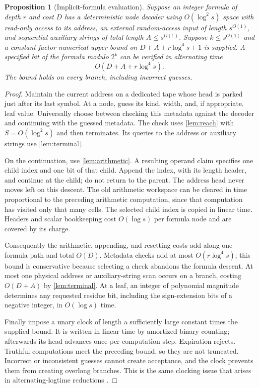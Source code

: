 \documentclass[11pt]{article}
\newtheorem{proposition}[theorem]{Proposition}
\theoremstyle{definition}
\theoremstyle{remark}
\begin{document}
\begin{proposition}[Implicit-formula evaluation]\label{prop:evaluate}
Suppose an integer formula of depth $r$ and cost $D$ has a deterministic node decoder using $O(\log^2s)$ space with read-only access to its address, an external random-access input of length $s^{O(1)}$, and sequential auxiliary strings of total length $A\le s^{O(1)}$. Suppose $k\le s^{O(1)}$ and a constant-factor numerical upper bound on $D+A+r\log^4s+1$ is supplied. A specified bit of the formula modulo $2^k$ can be verified in alternating time
\[
 O(D+A+r\log^4s).
\]
The bound holds on every branch, including incorrect guesses.
\end{proposition}

\begin{proof}
Maintain the current address on a dedicated tape whose head is parked just after its last symbol. At a node, guess its kind, width, and, if appropriate, leaf value. Universally choose between checking this metadata against the decoder and continuing with the guessed metadata. The check uses \cref{lem:reach} with $S=O(\log^2s)$ and then terminates. Its queries to the address or auxiliary strings use \cref{lem:terminal}.

On the continuation, use \cref{lem:arithmetic}. A resulting operand claim specifies one child index and one bit of that child. Append the index, with its length header, and continue at the child; do not return to the parent. The address head never moves left on this descent. The old arithmetic workspace can be cleared in time proportional to the preceding arithmetic computation, since that computation has visited only that many cells. The selected child index is copied in linear time. Headers and scalar bookkeeping cost $O(\log s)$ per formula node and are covered by its charge.

Consequently the arithmetic, appending, and resetting costs add along one formula path and total $O(D)$. Metadata checks add at most $O(r\log^4s)$; this bound is conservative because selecting a check abandons the formula descent. At most one physical address or auxiliary-string scan occurs on a branch, costing $O(D+A)$ by \cref{lem:terminal}. At a leaf, an integer of polynomial magnitude determines any requested residue bit, including the sign-extension bits of a negative integer, in $O(\log s)$ time.

Finally impose a unary clock of length a sufficiently large constant times the supplied bound. It is written in linear time by amortized binary counting; afterwards its head advances once per computation step. Expiration rejects. Truthful computations meet the preceding bound, so they are not truncated. Incorrect or inconsistent guesses cannot create acceptance, and the clock prevents them from creating overlong branches. This is the same clocking issue that arises in alternating-logtime reductions \cite{Buss87}.


\end{proof}
\end{document}
